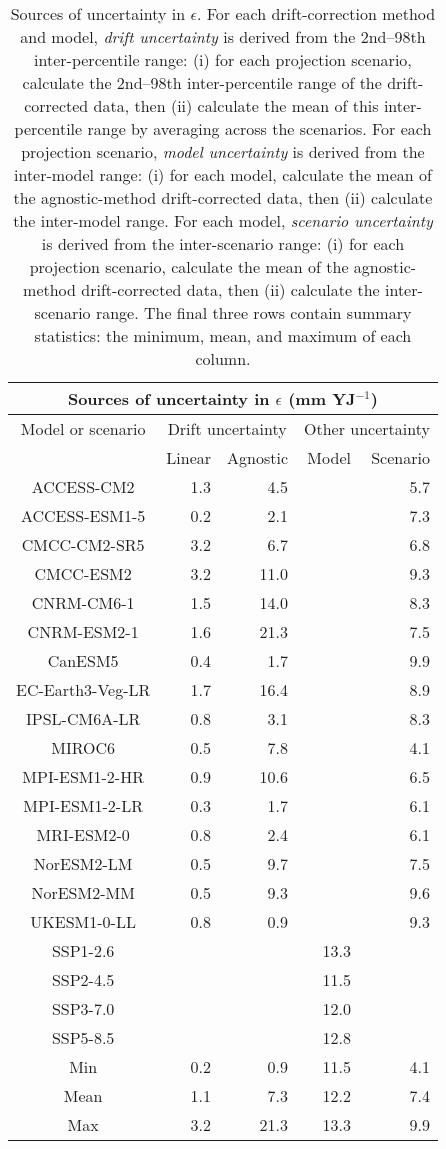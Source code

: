 \begin{table*}[t]
\centering
\caption{Sources of uncertainty in $\epsilon$. For each drift-correction method and model, \emph{drift uncertainty} is derived from the 2nd--98th inter-percentile range: (i) for each projection scenario, calculate the 2nd--98th inter-percentile range of the drift-corrected data, then (ii) calculate the mean of this inter-percentile range by averaging across the scenarios. For each projection scenario, \emph{model uncertainty} is derived from the inter-model range: (i) for each model, calculate the mean of the agnostic-method drift-corrected data, then (ii) calculate the inter-model range. For each model, \emph{scenario uncertainty} is derived from the inter-scenario range: (i) for each projection scenario, calculate the mean of the agnostic-method drift-corrected data, then (ii) calculate the inter-scenario range. The final three rows contain summary statistics: the minimum, mean, and maximum of each column.}
\begin{tabular}{c|rr|rr}
\toprule
\multicolumn{5}{c}{Sources of uncertainty in $\epsilon$ (mm YJ$^{-1}$)} \\ 
\midrule
Model or scenario & \multicolumn{2}{c|}{Drift uncertainty} & \multicolumn{2}{c}{Other uncertainty} \\
 & Linear & Agnostic & Model & Scenario \\
\midrule
ACCESS-CM2 & 1.3 & 4.5 &  & 5.7 \\
ACCESS-ESM1-5 & 0.2 & 2.1 &  & 7.3 \\
CMCC-CM2-SR5 & 3.2 & 6.7 &  & 6.8 \\
CMCC-ESM2 & 3.2 & 11.0 &  & 9.3 \\
CNRM-CM6-1 & 1.5 & 14.0 &  & 8.3 \\
CNRM-ESM2-1 & 1.6 & 21.3 &  & 7.5 \\
CanESM5 & 0.4 & 1.7 &  & 9.9 \\
EC-Earth3-Veg-LR & 1.7 & 16.4 &  & 8.9 \\
IPSL-CM6A-LR & 0.8 & 3.1 &  & 8.3 \\
MIROC6 & 0.5 & 7.8 &  & 4.1 \\
MPI-ESM1-2-HR & 0.9 & 10.6 &  & 6.5 \\
MPI-ESM1-2-LR & 0.3 & 1.7 &  & 6.1 \\
MRI-ESM2-0 & 0.8 & 2.4 &  & 6.1 \\
NorESM2-LM & 0.5 & 9.7 &  & 7.5 \\
NorESM2-MM & 0.5 & 9.3 &  & 9.6 \\
UKESM1-0-LL & 0.8 & 0.9 &  & 9.3 \\
SSP1-2.6 &  &  & 13.3 &  \\
SSP2-4.5 &  &  & 11.5 &  \\
SSP3-7.0 &  &  & 12.0 &  \\
SSP5-8.5 &  &  & 12.8 &  \\
\midrule
Min & 0.2 & 0.9 & 11.5 & 4.1 \\
Mean & 1.1 & 7.3 & 12.2 & 7.4 \\
Max & 3.2 & 21.3 & 13.3 & 9.9 \\
\bottomrule
\end{tabular}
\end{table*}
